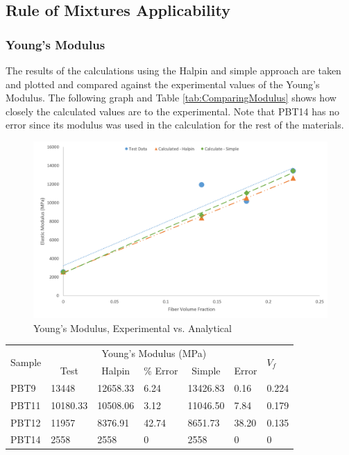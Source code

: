 \documentclass[11pt]{article}
\begin{document}
\subsection{Rule of Mixtures Applicability}

\subsubsection{Young's Modulus}

The results of the calculations using the Halpin and simple approach are taken and plotted and compared against the experimental values of the Young's Modulus. The following graph and Table \ref{tab:ComparingModulus} shows how closely the calculated values are to the experimental. Note that PBT14 has no error since its modulus was used in the calculation for the rest of the materials.

\begin{figure}[H]
\centering
\includegraphics[width=.95\linewidth]{figures/modulus_test_vs_calc.png}
\caption{Young's Modulus, Experimental vs. Analytical}
\label{ModulusCompare}
\end{figure}

\begin{center}
 \label{tab:ComparingModulus}
\begin{tabular}{p{1.25cm} || p{1.5cm} | p{1.5cm} | p{1.5cm} | p{1.5cm} | p{1.5cm} | p{1.5cm}}
\hline
 \multirow{2}{*}{Sample} & \multicolumn{5}{c|}{Young's Modulus (MPa)} & \multirow{2}{*}{\(V_f\)} \\
   &  \multicolumn{1}{c}{Test} & \multicolumn{1}{c}{Halpin} & \multicolumn{1}{c}{\% Error} & \multicolumn{1}{c}{Simple} & \multicolumn{1}{c|}{ Error} \\
\hline
PBT9 & 13448 & 12658.33 & 6.24 & 13426.83 & 0.16 & 0.224\\
PBT11 & 10180.33 & 10508.06 & 3.12 & 11046.50 & 7.84 &  0.179\\
PBT12 & 11957 & 8376.91 & 42.74 & 8651.73 & 38.20 & 0.135 \\
PBT14 & 2558 & 2558 & 0 & 2558 & 0 & 0\\
\hline
\end{tabular}
\end{center}
\singlespacing
\end{document}
